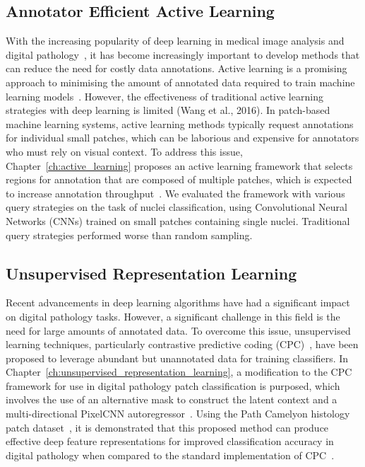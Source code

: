\subsection*{Annotator Efficient Active Learning}
With the increasing popularity of deep learning in medical image analysis and digital pathology~\citep{tizhoosh2018artificial}, it has become increasingly important to develop methods that can reduce the need for costly data annotations. Active learning is a promising approach to minimising the amount of annotated data required to train machine learning models~\citep{settles2009active}. However, the effectiveness of traditional active learning strategies with deep learning is limited (Wang et al., 2016). In patch-based machine learning systems, active learning methods typically request annotations for individual small patches, which can be laborious and expensive for annotators who must rely on visual context. To address this issue, Chapter~\ref{ch:active_learning} proposes an active learning framework that selects regions for annotation that are composed of multiple patches, which is expected to increase annotation throughput~\citep{carse2019active}. We evaluated the framework with various query strategies on the task of nuclei classification, using Convolutional Neural Networks (CNNs) trained on small patches containing single nuclei. Traditional query strategies performed worse than random sampling.

\subsection*{Unsupervised Representation Learning}
Recent advancements in deep learning algorithms have had a significant impact on digital pathology tasks. However, a significant challenge in this field is the need for large amounts of annotated data. To overcome this issue, unsupervised learning techniques, particularly contrastive predictive coding (CPC)~\citep{oord2018representation}, have been proposed to leverage abundant but unannotated data for training classifiers. In Chapter~\ref{ch:unsupervised_representation_learning}, a modification to the CPC framework for use in digital pathology patch classification is purposed, which involves the use of an alternative mask to construct the latent context and a multi-directional PixelCNN autoregressor~\citep{oord2016pixel}. Using the Path Camelyon histology patch dataset~\citep{veeling2018rotation}, it is demonstrated that this proposed method can produce effective deep feature representations for improved classification accuracy in digital pathology when compared to the standard implementation of CPC~\citep{carse2021unsupervised}.

